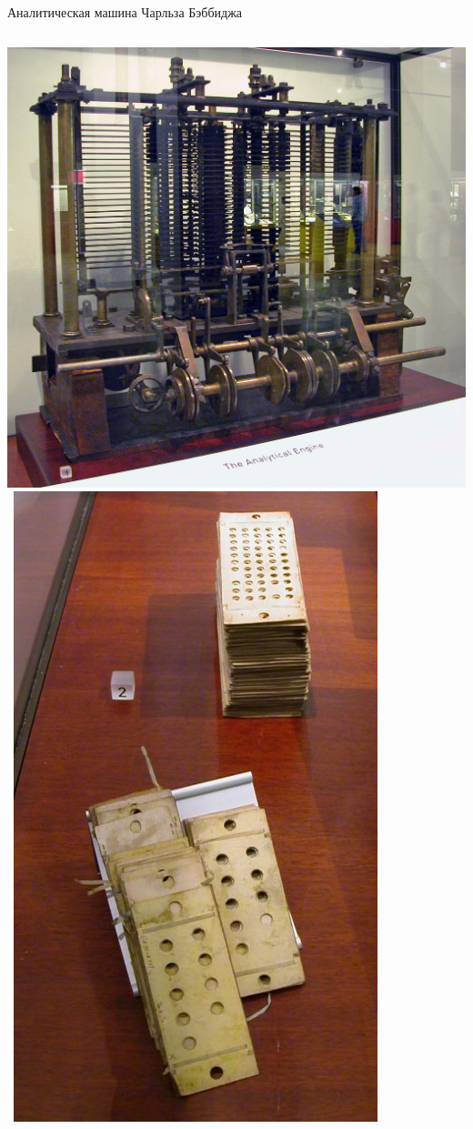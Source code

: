 \documentclass[pdf,9pt,aspectratio=169]{beamer}
\begin{document}
\begin{frame}{Аналитическая машина Чарльза Бэббиджа}
\begin{columns}[T]
\begin{column}[]{0.45\textwidth}
\begin{exampleblock}
\begin{center}
          \includegraphics[height=.33\textheight]{images/AnalyticalEngineModel.jpg}\ 
          \includegraphics[height=.33\textheight]{images/AnalyticalEnginePunchedCards.jpg}

\end{center}
\end{exampleblock}
\end{column}
\end{columns}
\end{frame}
\end{document}
